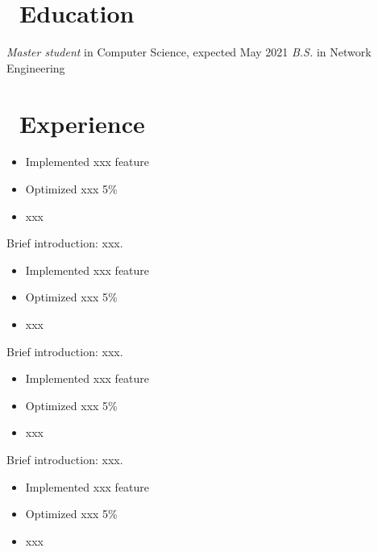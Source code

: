 \documentclass{resume}
\begin{document}



\section{\faGraduationCap\ Education}
\textit{Master student} in Computer Science, expected May 2021
\textit{B.S.} in Network Engineering

\section{\faUsers\ Experience}
\begin{itemize}
  \item Implemented xxx feature
  \item Optimized xxx 5\%
  \item xxx
\end{itemize}

Brief introduction: xxx.
\begin{itemize}
  \item Implemented xxx feature
  \item Optimized xxx 5\%
  \item xxx
\end{itemize}

Brief introduction: xxx.
\begin{itemize}
  \item Implemented xxx feature
  \item Optimized xxx 5\%
  \item xxx
\end{itemize}

Brief introduction: xxx.
\begin{itemize}
  \item Implemented xxx feature
  \item Optimized xxx 5\%
  \item xxx
\end{itemize}
\end{document}
